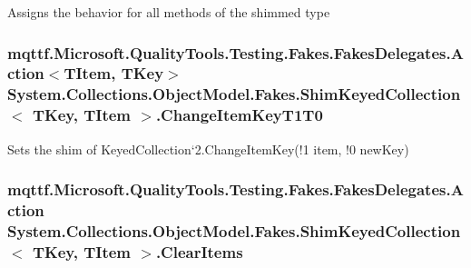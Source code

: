 Assigns the behavior for all methods of the shimmed type

\hypertarget{class_system_1_1_collections_1_1_object_model_1_1_fakes_1_1_shim_keyed_collection_3_01_t_key_00_01_t_item_01_4_ae8e0fd0cfdadd034cc9defd26ee9e9b0}{
\subsubsection[{Change\-Item\-Key\-T1\-T0}]{\setlength{\rightskip}{0pt plus 5cm}mqttf.\-Microsoft.\-Quality\-Tools.\-Testing.\-Fakes.\-Fakes\-Delegates.\-Action$<$T\-Item, T\-Key$>$ System.\-Collections.\-Object\-Model.\-Fakes.\-Shim\-Keyed\-Collection$<$ T\-Key, T\-Item $>$.Change\-Item\-Key\-T1\-T0\hspace{0.3cm}{\ttfamily [set]}}}\label{class_system_1_1_collections_1_1_object_model_1_1_fakes_1_1_shim_keyed_collection_3_01_t_key_00_01_t_item_01_4_ae8e0fd0cfdadd034cc9defd26ee9e9b0}


Sets the shim of Keyed\-Collection`2.Change\-Item\-Key(!1 item, !0 new\-Key)

\hypertarget{class_system_1_1_collections_1_1_object_model_1_1_fakes_1_1_shim_keyed_collection_3_01_t_key_00_01_t_item_01_4_ae47c122bb5dbf14a2db7866c775ede1f}{
\subsubsection[{Clear\-Items}]{\setlength{\rightskip}{0pt plus 5cm}mqttf.\-Microsoft.\-Quality\-Tools.\-Testing.\-Fakes.\-Fakes\-Delegates.\-Action System.\-Collections.\-Object\-Model.\-Fakes.\-Shim\-Keyed\-Collection$<$ T\-Key, T\-Item $>$.Clear\-Items\hspace{0.3cm}{\ttfamily [set]}}}\label{class_system_1_1_collections_1_1_object_model_1_1_fakes_1_1_shim_keyed_collection_3_01_t_key_00_01_t_item_01_4_ae47c122bb5dbf14a2db7866c775ede1f}


